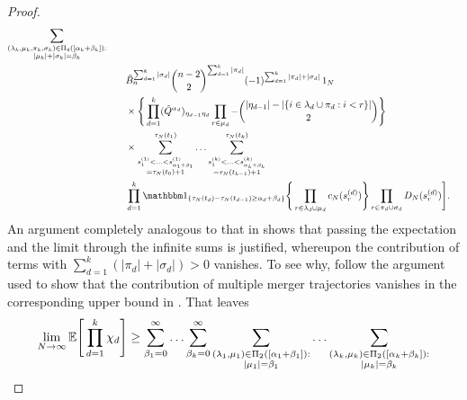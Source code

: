 \begin{proof}
\begin{align*}
        \sum_{\substack{ ( \lambda_k, \mu_k, \pi_k, \sigma_k ) 
        \in \Pi_4( [ \alpha_k + \beta_k ] ) :\\ | \mu_k | + | \sigma_k | = \beta_k }} \\
    &\qquad \tilde{B}_n^{ \sum_{ d = 1 }^k | \sigma_d | } 
        \binom{ n - 2 }{ 2 }^{ \sum_{ d = 1 }^k| \pi_d | }
        ( -1 )^{ \sum_{ d = 1 }^k | \pi_d | + | \sigma_d | } \,
        \ON \\ %
    &\qquad \times \Bigg\{ \prod_{ d = 1 }^k 
        ( \tilde{ Q }^{ \alpha_d } )_{ \eta_{ d - 1 } \eta_d } 
        \prod_{ r \in \mu_d } - 
        \binom{ | \eta_{ d - 1 } | - | \{ i \in \lambda_d \cup \pi_d : i < r \} | }{ 2 } 
        \Bigg\} \\
    &\qquad \times 
        \sum_{\substack{ s_1^{ ( 1 ) } < \ldots < s_{ \alpha_1 + \beta_1 }^{ ( 1 ) } 
        \\= \tau_N( t_0 ) + 1 }}^{ \tau_N( t_1 ) } \ldots 
        \sum_{\substack{ s_1^{ ( k ) } < \ldots < s_{ \alpha_k + \beta_k }^{ ( k ) } 
        \\= \tau_N( t_{ k - 1 } ) + 1 }}^{ \tau_N( t_k ) } \\
    &\qquad \prod_{ d = 1 }^k 
        \I{ \tau_N( t_d ) - \tau_N( t_{ d - 1 } ) \geq \alpha_d + \beta_d } 
        \Bigg\{ \prod_{ r \in \lambda_d \cup \mu_d } c_N( s_r^{ ( d ) } ) \Bigg\} 
        \prod_{ r \in \pi_d \cup \sigma_d }  D_N( s_r^{ ( d ) } ) \Bigg].
\end{align*}
An argument completely analogous to that in \textcite[Appendix]{koskela2018} shows that passing the expectation and the limit through the infinite sums is justified, whereupon the contribution of terms with $ \sum_{ d = 1 }^k ( | \pi_d | + | \sigma_d | ) > 0$ vanishes.
To see why, follow the argument used to show that the contribution of multiple merger trajectories vanishes in the corresponding upper bound in \textcite{koskela2018}.
That leaves
\begin{align}
\lim_{ N \rightarrow \infty } \E\Bigg[ \prod_{ d = 1 }^k \chi_d \Bigg] 
&\geq \sum_{ \beta_1 = 0 }^{ \infty } \ldots \sum_{ \beta_k = 0 }^{ \infty }
        \sum_{\substack{ ( \lambda_1, \mu_1 ) \in \Pi_2( [ \alpha_1 + \beta_1 ] ) :
        \\ | \mu_1 | = \beta_1 }} \ldots 
        \sum_{\substack{ ( \lambda_k, \mu_k ) \in \Pi_2( [ \alpha_k + \beta_k ] ) :
        \\ | \mu_k | = \beta_k }} \notag \\

\end{align}
\end{proof}
